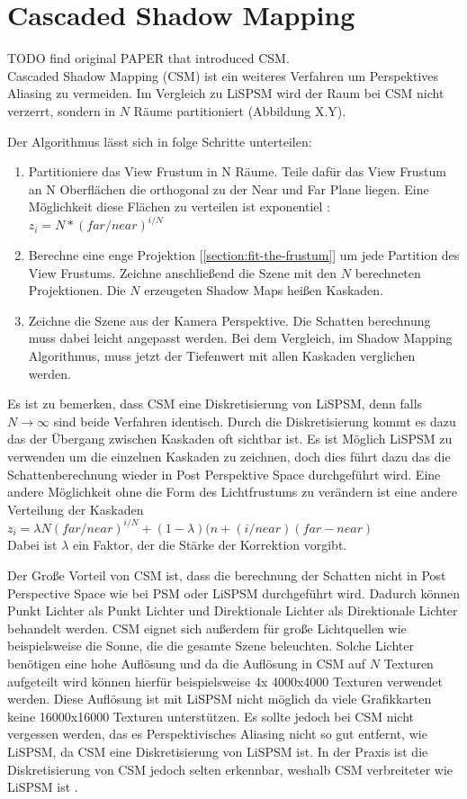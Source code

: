 \section{Cascaded Shadow Mapping}
\label{section:csm}
TODO find original PAPER that introduced CSM.\\
Cascaded Shadow Mapping (CSM) ist ein weiteres Verfahren um Perspektives Aliasing zu vermeiden.
Im Vergleich zu LiSPSM wird der Raum bei CSM nicht verzerrt, sondern in $N$ Räume partitioniert (Abbildung X.Y).
\par
Der Algorithmus lässt sich in folge Schritte unterteilen:
\begin{enumerate}
  \item Partitioniere das View Frustum in N Räume. 
    Teile dafür das View Frustum an N Oberflächen die orthogonal zu der Near und Far Plane liegen.
    Eine Möglichkeit diese Flächen zu verteilen ist exponentiel : $z_{i} = N * (far / near)^{i/N}$
  \item Berechne eine enge Projektion [\ref{section:fit-the-frustum}] um jede Partition des View Frustums.
    Zeichne anschließend die Szene mit den $N$ berechneten Projektionen.
    Die $N$ erzeugeten Shadow Maps heißen Kaskaden.
  \item Zeichne die Szene aus der Kamera Perspektive. 
    Die Schatten berechnung muss dabei leicht angepasst werden.
    Bei dem Vergleich, im Shadow Mapping Algorithmus, muss jetzt der Tiefenwert mit allen Kaskaden verglichen werden.
\end{enumerate}
Es ist zu bemerken, dass CSM eine Diskretisierung von LiSPSM, denn falls $N\rightarrow\infty$ sind beide Verfahren identisch. 
Durch die Diskretisierung kommt es dazu das der Übergang zwischen Kaskaden oft sichtbar ist.
Es ist Möglich LiSPSM zu verwenden um die einzelnen Kaskaden zu zeichnen, doch dies führt dazu das die Schattenberechnung wieder
in Post Perspektive Space durchgeführt wird. 
Eine andere Möglichkeit ohne die Form des Lichtfrustums zu verändern ist eine andere Verteilung der Kaskaden\\
$z_{i} = \lambda{}N(far/near)^{i/N} + (1-\lambda{})(n+(i/near)(far - near)$\\
Dabei ist $\lambda$ ein Faktor, der die Stärke der Korrektion vorgibt.
\par
Der Große Vorteil von CSM ist, dass die berechnung der Schatten nicht in Post Perspective Space wie bei PSM oder LiSPSM 
durchgeführt wird. 
Dadurch können Punkt Lichter als Punkt Lichter und Direktionale Lichter als Direktionale Lichter behandelt werden.
CSM eignet sich außerdem für große Lichtquellen wie beispielsweise die Sonne, die die gesamte Szene beleuchten.
Solche Lichter benötigen eine hohe Auflösung und da die Auflösung in CSM auf $N$ Texturen aufgeteilt wird können hierfür beispielsweise 
4x 4000x4000 Texturen verwendet werden. Diese Auflösung ist mit LiSPSM nicht möglich da viele Grafikkarten keine
16000x16000 Texturen unterstützen.
Es sollte jedoch bei CSM nicht vergessen werden, das es Perspektivisches Aliasing nicht so gut entfernt, wie 
LiSPSM, da CSM eine Diskretisierung von LiSPSM ist.
In der Praxis ist die Diskretisierung von CSM jedoch selten erkennbar, weshalb CSM verbreiteter wie LiSPSM ist \cite{Survey2011}.

